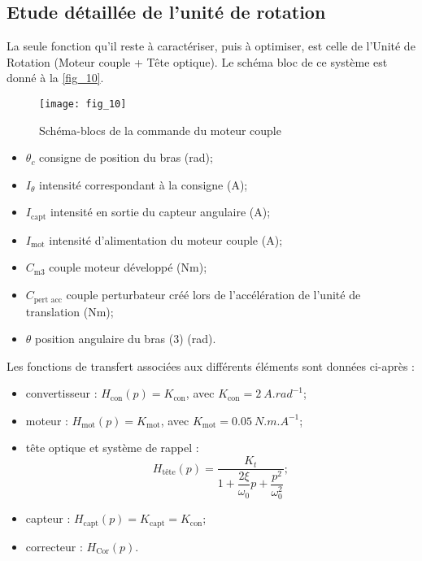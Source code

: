 \subsection{Etude détaillée de l'unité de rotation}

\ifprof
\else

La seule fonction qu’il reste à caractériser, puis à optimiser, est celle de l’Unité de Rotation (Moteur
couple + Tête optique). Le schéma bloc de ce système est donné à la \autoref{fig_10}.


\begin{figure}[H]
\centering
\texttt{[image: fig\_10]}
\caption{\label{fig_10} Schéma-blocs de la commande du moteur couple}
\end{figure}


\begin{multicols}{2}
\begin{itemize}
\item $\theta_c$ consigne de position du bras (rad);
\item $I_{\theta}$ intensité correspondant à la consigne (A);
\item $I_{\text{capt}}$ intensité en sortie du capteur angulaire (A);
\item $I_{\text{mot}}$ intensité d’alimentation du moteur couple (A);
\item $C_{\text{m3}}$ couple moteur développé (Nm);
\item $C_{\text{pert acc}}$ couple perturbateur créé lors de l’accélération de
l’unité de translation (Nm);
\item $\theta$ position angulaire du bras (3) (rad).
\end{itemize}
\end{multicols}

Les fonctions de transfert associées aux différents éléments sont données ci-après :
\begin{multicols}{2}
\begin{itemize}
\item convertisseur : $H_{\text{con}}(p)=K_{\text{con}}$, avec $K_{\text{con}}=\SI{2}{A.rad^{-1}}$;
\item moteur : $H_{\text{mot}}(p)=K_{\text{mot}}$, avec $K_{\text{mot}}=\SI{0,05}{N.m.A^{-1}}$;
\item tête optique et système de rappel : $$H_{\text{tête}}(p)=\dfrac{K_t}{1+\dfrac{2\xi}{\omega_0}p+\dfrac{p^2}{\omega_0^2}};$$
\item capteur : $H_{\text{capt}}(p)=K_{\text{capt}}=K_{\text{con}}$;
\item correcteur : $H_{\text{Cor}}(p)$.
\end{itemize}
\end{multicols}
\fi

